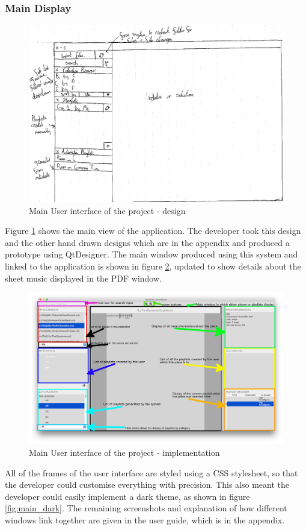 \subsubsection{Main Display}
\begin{figure}[H]
\centering
    \includegraphics[width=500pt]{designs/main}
    \caption{Main User interface of the project - design}
    \label{fig:main_handdrawn}
\end{figure}
Figure \ref{fig:main_handdrawn} shows the main view of the application. The developer took this design and the other hand drawn designs which are in the appendix and produced a prototype using QtDesigner. The main window produced using this system and linked to the application is shown in figure \ref{fig:main}, updated to show details about the sheet music displayed in the PDF window. 
\begin{figure}[H]
	\centering
    \includegraphics[width=450pt]{annotated_gui}
    \caption{Main User interface of the project - implementation}
    \label{fig:main}
\end{figure}
All of the frames of the user interface are styled using a CSS stylesheet, so that the developer could customise everything with precision. This also meant the developer could easily implement a dark theme, as shown in figure \ref{fig:main_dark}. The remaining screenshots and explanation of how different windows link together are given in the user guide, which is in the appendix.


